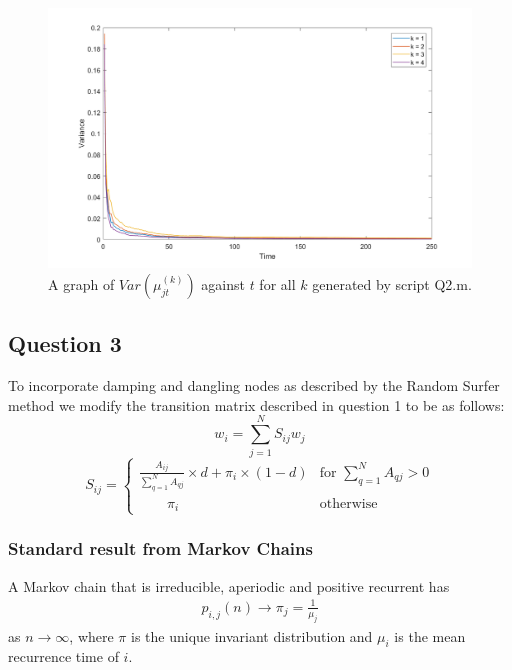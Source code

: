 \documentclass[a4paper]{article}
\begin{document}
\begin{figure}[H]
    \centering
    \includegraphics[width=\columnwidth]{q2var.png}
    \caption{A graph of $Var(\mu_{jt}^{(k)})$ against $t$ for all $k$ generated by script Q2.m.}
    \label{fig:q2b}
\end{figure}

\subsection*{Question 3}

To incorporate damping and dangling nodes as described by the Random Surfer method we modify the transition matrix described in question 1 to be as follows:
\begin{equation*}
    w_i = \sum^N_{j=1}S_{ij}w_j
\end{equation*}
\begin{equation*}
    S_{ij} = \begin{cases}
        \frac{A_{ij}}{\sum_{q=1}^N A_{qj}}\times d + \pi_i \times (1-d) & \text{for } \sum_{q=1}^N A_{qj} > 0 \\
        \qquad \pi_i & \text{otherwise}
    \end{cases}
\end{equation*}

\subsubsection*{Standard result from Markov Chains}
A Markov chain that is irreducible, aperiodic and positive recurrent has
\begin{align*}
    p_{i,j}(n) \rightarrow \pi_j = \frac{1}{\mu_j}
\end{align*}
as $n\rightarrow \infty$, where $\pi$ is the unique invariant distribution and $\mu_i$ is the mean recurrence time of $i$.
\end{document}
